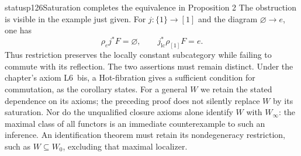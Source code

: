 \begin{dcomment}{status}{p126}{Saturation completes the equivalence in Proposition 2}
The obstruction is visible in the example just given. For $j:\{1\}\to[1]$ and the diagram $\varnothing\to e$, one has
\[
 \rho_ej^*F=\varnothing,
 \qquad j^*_{\mathrm{lc}}\rho_{[1]}F=e.
\]
Thus restriction preserves the locally constant subcategory while failing to commute with its reflection. The two assertions must remain distinct. Under the chapter's axiom L6~bis, a Hot-fibration gives a sufficient condition for commutation, as the corollary states. For a general $W$ we retain the stated dependence on its axioms; the preceding proof does not silently replace $W$ by its saturation. Nor do the unqualified closure axioms alone identify $W$ with $W_\infty$: the maximal class of all functors is an immediate counterexample to such an inference. An identification theorem must retain its nondegeneracy restriction, such as $W\subseteq W_0$, excluding that maximal localizer.
\end{dcomment}


